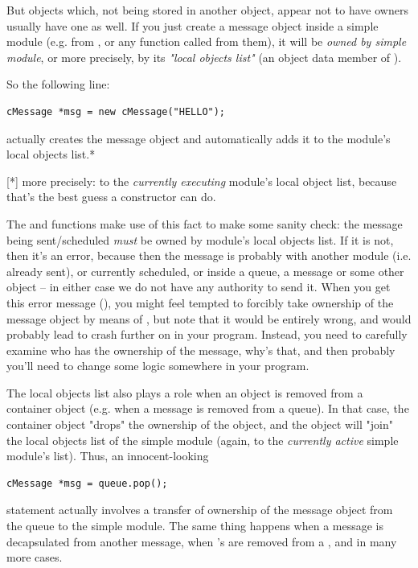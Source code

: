 But objects which, not being stored in another object, appear not to
have owners usually have one as well. If you just create a
message object inside a simple module (e.g. from ,
 or any function called from them), it will
be \textit{owned by simple module}, or more precisely, by
its \textit{"local objects list"} (an object data member of
).

So the following line:

\begin{verbatim}
cMessage *msg = new cMessage("HELLO");
\end{verbatim}

actually creates the message object and automatically adds it
to the module's local objects list.*

  [*] more precisely: to the \textit{currently executing} module's
  local object list, because that's the best guess a 
  constructor can do.

The  and  functions make use of this fact
to make some sanity check: the message being sent/scheduled
\textit{must} be owned by module's local objects list.
If it is not, then it's an error, because then the message is
probably with another module (i.e. already sent), or
currently scheduled, or inside a queue, a message or some
other object -- in either case we do not have any authority
to send it. When you get this error message (),
you might feel tempted to forcibly take ownership of the message object
by means of , but note that it would be
entirely wrong, and would probably lead to crash further on in
your program. Instead, you need to carefully examine who
has the ownership of the message, why's that, and then
probably you'll need to change some logic somewhere
in your program.


The local objects list also plays a role when an object is
removed from a container object (e.g. when a message is removed
from a queue).
In that case, the container object "drops" the ownership of the
object, and the object will "join" the local objects list
of the simple module (again, to the \textit{currently active} simple
module's list). Thus, an innocent-looking

\begin{verbatim}
cMessage *msg = queue.pop();
\end{verbatim}

statement actually involves a transfer of ownership of the message
object from the queue to the simple module.
The same thing happens when a message is decapsulated from another message,
when 's are removed from a , and in many more cases.

